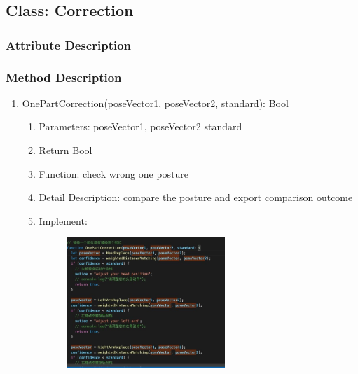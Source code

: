 \documentclass[16pt]{scrreprt}
\begin{document}
\subsection{Class: Correction}
\subsubsection{Attribute Description}

\subsubsection{Method Description}
\begin{enumerate}
    \item OnePartCorrection(poseVector1, poseVector2, standard): Bool
        \begin{enumerate}
            \item Parameters: poseVector1, poseVector2 standard
            \item Return Bool
            \item Function: check wrong one posture 
            \item Detail Description: compare the posture and export comparison outcome
            \item Implement:
                \begin{figure}[H]
                    \centering
                    \includegraphics[width=0.6\textwidth]{diagrams/correction-0.jpg}\\
                \end{figure}
        \end{enumerate}


\end{enumerate}
\end{document}
